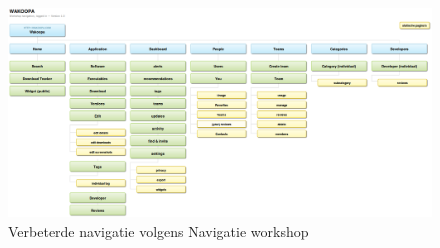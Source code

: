       \begin{figure}
      \begin{center}
      \caption{Verbeterde navigatie volgens Navigatie workshop}
        \includegraphics[width=\textwidth]{../images/workshopnav}
      \end{center}
    \end{figure}

